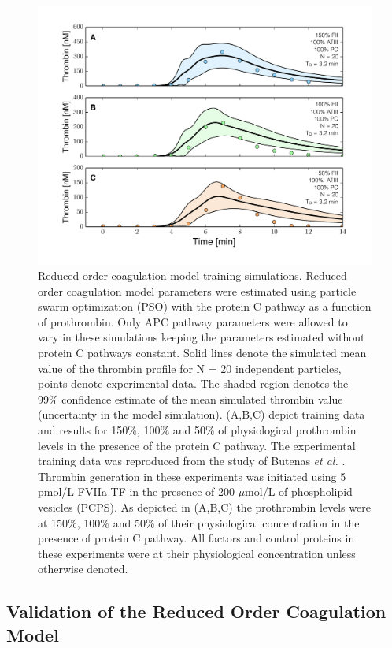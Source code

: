 \documentclass[processes,article,received,moreauthors,pdftex,12pt,a4paper]{mdpi}
\begin{document}
\begin{figure}[H]
\centering
\includegraphics[width=1.0\textwidth]{./figs/Figure-4-DIFF_FII_APC.pdf}
\caption{Reduced order coagulation model training simulations.
Reduced order coagulation model parameters were estimated using particle swarm optimization (PSO) with the protein C pathway as a function of prothrombin.
Only APC pathway parameters were allowed to vary in these simulations keeping the parameters estimated without protein C pathways constant. 
Solid lines denote the simulated mean value of the thrombin profile for N = 20 independent particles, points denote experimental data.
The shaded region denotes the 99\% confidence estimate of the mean simulated thrombin value (uncertainty in the model simulation).
(A,B,C) depict training data and results for 150\%, 100\% and 50\% of physiological prothrombin levels in the presence of the protein C pathway. 
The experimental training data was reproduced from the study of Butenas \textit{et al.} \citep{Butenas:1999aa}.
Thrombin generation in these experiments was initiated using 5 pmol/L FVIIa-TF in the presence of 200 $\mu$mol/L of phospholipid vesicles (PCPS). 
As depicted in (A,B,C) the prothrombin levels were at 150\%, 100\% and 50\% of their physiological concentration in the presence of protein C pathway. 
All factors and control proteins in these experiments were at their physiological concentration unless otherwise denoted.}\label{fig-diff_fII_APC}
\end{figure}

\subsection{Validation of the Reduced Order Coagulation Model}
\end{document}
